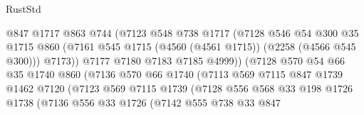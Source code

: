 \begin{lexlean}{RustStd}
\begin{coremodule}
                                @847
                                @1717
                                @863
                                @744
                                (@7123
                                  @548
                                  @738
                                  @1717
                                  (@7128
                                    @546
                                    @54
                                    @300
                                    @35
                                    @1715
                                    @860
                                    (@7161
                                      @545
                                      @1715
                                      (@4560 (@4561 @1715))
                                      (@2258 (@4566 @545 @300)))
                                    @7173))
                                @7177
                                @7180
                                @7183
                                @7185
                                @4999))
                            (@7128
                              @570
                              @54
                              @66
                              @35
                              @1740
                              @860
                              (@7136
                                @570
                                @66
                                @1740
                                (@7113
                                  @569
                                  @7115
                                  @847
                                  @1739
                                  @1462
                                  @7120
                                  (@7123
                                    @569
                                    @7115
                                    @1739
                                    (@7128
                                      @556
                                      @568
                                      @33
                                      @198
                                      @1726
                                      @1738
                                      (@7136
                                        @556
                                        @33
                                        @1726
                                        (@7142
                                          @555
                                          @738
                                          @33
                                          @847

\end{coremodule}
\end{lexlean}
